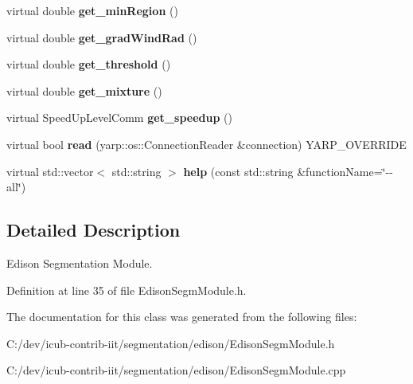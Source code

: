 \begin{DoxyCompactItemize}
\mbox{\label{classEdisonSegmModule_ad61a5ccea53f415be9f2b76a8781689f}} 
virtual double {\bfseries get\+\_\+min\+Region} ()
\item 
\mbox{\label{classEdisonSegmModule_ab9ce5f24dd33f58d543b25ec0257af41}} 
virtual double {\bfseries get\+\_\+grad\+Wind\+Rad} ()
\item 
\mbox{\label{classEdisonSegmModule_a8e3ab7941df516f42357330a80d1e408}} 
virtual double {\bfseries get\+\_\+threshold} ()
\item 
\mbox{\label{classEdisonSegmModule_a58df44d5dbba062170e5e22f957da907}} 
virtual double {\bfseries get\+\_\+mixture} ()
\item 
\mbox{\label{classEdisonSegmModule_ae1f22b6113534640a3faedd22505932b}} 
virtual Speed\+Up\+Level\+Comm {\bfseries get\+\_\+speedup} ()
\item 
\mbox{\label{classSegmentationModule_a0779d249de1b344855f64176e9b84391}} 
virtual bool {\bfseries read} (yarp\+::os\+::\+Connection\+Reader \&connection) Y\+A\+R\+P\+\_\+\+O\+V\+E\+R\+R\+I\+DE
\item 
\mbox{\label{classSegmentationModule_af5e7c395d563e6c9b170d509c2a01e0a}} 
virtual std\+::vector$<$ std\+::string $>$ {\bfseries help} (const std\+::string \&function\+Name=\char`\"{}-\/-\/all\char`\"{})
\end{DoxyCompactItemize}


\subsection{Detailed Description}
Edison Segmentation Module. 



Definition at line 35 of file Edison\+Segm\+Module.\+h.



The documentation for this class was generated from the following files\+:\begin{DoxyCompactItemize}
\item 
C\+:/dev/icub-\/contrib-\/iit/segmentation/edison/Edison\+Segm\+Module.\+h\item 
C\+:/dev/icub-\/contrib-\/iit/segmentation/edison/Edison\+Segm\+Module.\+cpp\end{DoxyCompactItemize}
